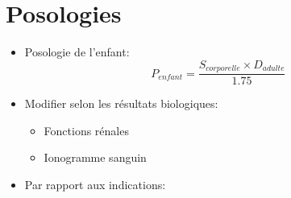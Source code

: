 \documentclass[11pt]{article}
\begin{document}
\section{Posologies}
\label{sec:orgd38a7c4}
\begin{itemize}
\item Posologie de l'enfant:
\[
  P_{enfant} = \frac{ S_{corporelle} \times D_{adulte} }{1.75}
  \]
\item Modifier selon les résultats biologiques:
\begin{itemize}
\item Fonctions rénales
\item Ionogramme sanguin
\end{itemize}
\item Par rapport aux indications:
\end{itemize}
\end{document}
